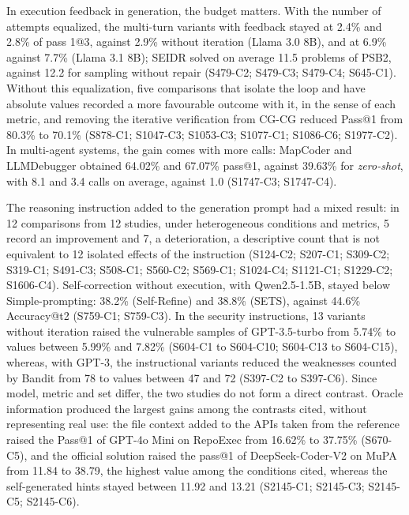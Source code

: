 In execution feedback in generation, the budget matters.
With the number of attempts equalized, the multi-turn variants with feedback stayed at
2.4\% and 2.8\% of pass 1@3, against 2.9\% without iteration (Llama 3.0 8B), and at 6.9\% against
7.7\% (Llama 3.1 8B); SEIDR solved on average 11.5 problems of PSB2, against 12.2 for
sampling without repair (S479-C2; S479-C3; S479-C4; S645-C1).
Without this equalization, five comparisons that isolate the loop and have absolute
values recorded a more favourable outcome with it, in the sense of each metric, and removing the iterative verification from CG-CG
reduced Pass@1 from 80.3\% to 70.1\% (S878-C1; S1047-C3; S1053-C3; S1077-C1;
S1086-C6; S1977-C2).
In multi-agent systems, the gain comes with more calls: MapCoder and
LLMDebugger obtained 64.02\% and 67.07\% pass@1, against 39.63\% for \textit{zero-shot}, with 8.1
and 3.4 calls on average, against 1.0 (S1747-C3; S1747-C4).

The reasoning instruction added to the generation prompt had a mixed result: in
12 comparisons from 12 studies, under heterogeneous conditions and metrics, 5 record an improvement and 7, a deterioration, a
descriptive count that is not equivalent to 12 isolated effects of the instruction (S124-C2; S207-C1; S309-C2; S319-C1; S491-C3; S508-C1;
S560-C2; S569-C1; S1024-C4; S1121-C1; S1229-C2; S1606-C4).
Self-correction without execution, with Qwen2.5-1.5B, stayed below Simple-prompting: 38.2\%
(Self-Refine) and 38.8\% (SETS), against 44.6\% Accuracy@t2 (S759-C1; S759-C3).
In the security instructions, 13 variants without iteration raised the vulnerable samples
of GPT-3.5-turbo from 5.74\% to values between 5.99\% and 7.82\% (S604-C1 to S604-C10;
S604-C13 to S604-C15), whereas, with GPT-3, the instructional variants reduced the
weaknesses counted by Bandit from 78 to values between 47 and 72 (S397-C2 to S397-C6).
Since model, metric and set differ, the two studies do not form a direct contrast.
Oracle information produced the largest gains among the contrasts cited, without representing real use: the file
context added to the APIs taken from the reference raised the Pass@1 of GPT-4o Mini on RepoExec from 16.62\% to 37.75\%
(S670-C5), and the official solution raised the pass@1 of DeepSeek-Coder-V2 on MuPA from 11.84 to 38.79, the highest value among the conditions cited, whereas the self-generated hints stayed between 11.92 and 13.21 (S2145-C1; S2145-C3;
S2145-C5; S2145-C6).

